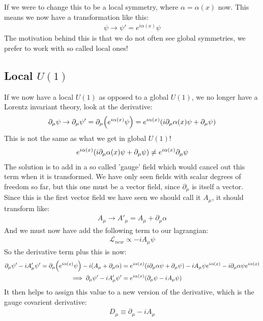\documentclass[12pt]{article}
\renewcommand{\L}{\mathcal{L}}
\newcommand{\D}{\partial}
\begin{document}
If we were to change this to be a local symmetry, where $\alpha=\alpha(x)$ now. This means we now have a transformation like this:
\begin{align*}
  \psi\to\psi'=e^{i\alpha(x)}\psi
\end{align*}
The motivation behind this is that we do not often see global symmetries, we prefer to work with so called local ones!

\subsection{Local $U(1)$}
If we now have a local $U(1)$ as opposed to a global $U(1)$, we no longer have a Lorentz invariant theory, look at the derivative:
\begin{align*}
  \D_\mu\psi\to\D_\mu\psi'=\D_\mu\qty(e^{i\alpha(x)}\psi)=
  e^{i\alpha(x)}\qty(i\D_\mu\alpha(x)\psi+\D_\mu\psi)
\end{align*}
This is not the same as what we get in global $U(1)$!
\begin{align*}
  e^{i\alpha(x)}\qty(i\D_\mu\alpha(x)\psi+\D_\mu\psi)\neq e^{i\alpha(x)}\D_\mu\psi
\end{align*}
The solution is to add in a so called 'gauge' field which would cancel out this term when it is transformed. We have only seen fields with scalar degrees of freedom so far, but this one must be a vector field, since $\D_\mu$ is itself a vector. Since this is the first vector field we have seen we should call it $A_\mu$, it should transform like:
\begin{align*}
  A_\mu\to A'_\mu=A_\mu + \D_\mu\alpha
\end{align*}
And we must now have add the following term to our lagrangian:
\begin{align*}
  \L_{new}\propto-iA_\mu\psi
\end{align*}
So the derivative term plus this is now:
\begin{align*}
  \D_\mu\psi'-iA'_\mu\psi'=\D_\mu\qty(e^{i\alpha(x)}\psi)-i(A_\mu+\D_\mu\alpha)&=
  e^{i\alpha(x)}\qty(i\D_\mu\alpha\psi+\D_\mu\psi)-iA_\mu\psi e^{i\alpha(x)}-i
  \D_\mu\alpha\psi e^{i\alpha(x)}\\
  \implies\D_\mu\psi'-iA'_\mu\psi' &=e^{i\alpha(x)}(\D_\mu\psi-iA_\mu\psi)
\end{align*}
It then helps to assign this value to a new version of the derivative, which is the gauge covarient derivative:
\begin{align*}
  D_\mu\equiv\D_\mu-iA_\mu
\end{align*}
\end{document}
